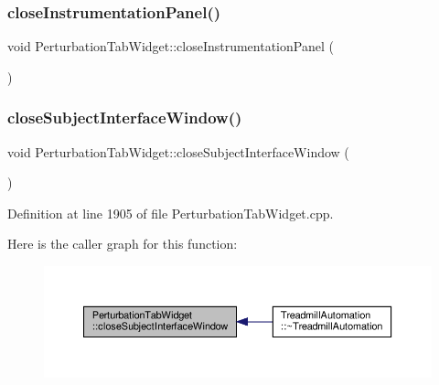 \subsubsection{\texorpdfstring{close\+Instrumentation\+Panel()}{closeInstrumentationPanel()}}
{\footnotesize\ttfamily void Perturbation\+Tab\+Widget\+::close\+Instrumentation\+Panel (\begin{DoxyParamCaption}{ }\end{DoxyParamCaption})}

\mbox{\label{class_perturbation_tab_widget_a133aa07dacbf905b3f8575cae27c1c4b}} 
\subsubsection{\texorpdfstring{close\+Subject\+Interface\+Window()}{closeSubjectInterfaceWindow()}}
{\footnotesize\ttfamily void Perturbation\+Tab\+Widget\+::close\+Subject\+Interface\+Window (\begin{DoxyParamCaption}{ }\end{DoxyParamCaption})}



Definition at line 1905 of file Perturbation\+Tab\+Widget.\+cpp.

Here is the caller graph for this function\+:
\nopagebreak
\begin{figure}[H]
\begin{center}
\leavevmode
\includegraphics[width=350pt]{class_perturbation_tab_widget_a133aa07dacbf905b3f8575cae27c1c4b_icgraph}
\end{center}
\end{figure}
\mbox{\label{class_perturbation_tab_widget_a91a2b49c6b8672cd15cce43be89083c2}} 
